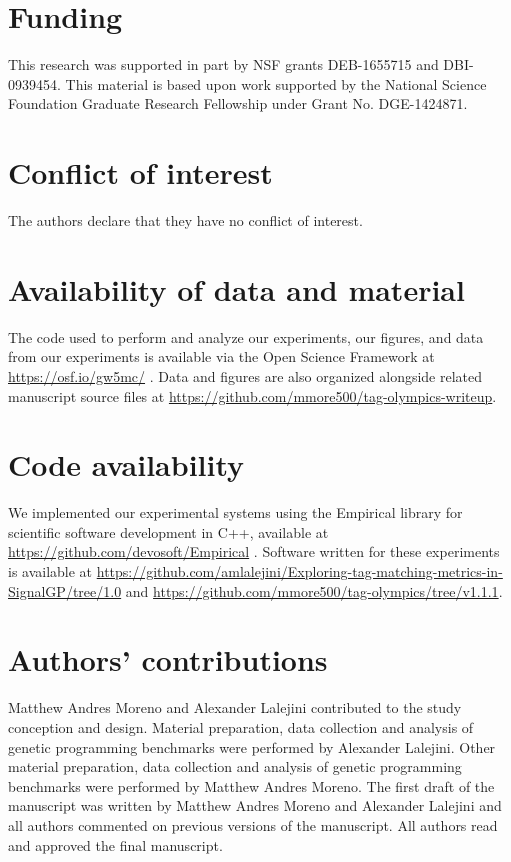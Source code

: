 \section*{Funding}

This research was supported in part by NSF grants DEB-1655715 and DBI-0939454.
This material is based upon work supported by the National Science Foundation Graduate Research Fellowship under Grant No. DGE-1424871.


\section*{Conflict of interest}

The authors declare that they have no conflict of interest.

\section*{Availability of data and material}

The code used to perform and analyze our experiments, our figures, and data from our experiments is available via the Open Science Framework at \url{https://osf.io/gw5mc/} \citep{foster2017open}.
Data and figures are also organized alongside related manuscript source files at \url{https://github.com/mmore500/tag-olympics-writeup}.

\section*{Code availability}

We implemented our experimental systems using the Empirical library for scientific software development in C++, available at \url{https://github.com/devosoft/Empirical} \citep{charles_ofria_2019_2575607}.
Software written for these experiments is available at \url{https://github.com/amlalejini/Exploring-tag-matching-metrics-in-SignalGP/tree/1.0} and \url{https://github.com/mmore500/tag-olympics/tree/v1.1.1}.

\section*{Authors' contributions} Matthew Andres Moreno and Alexander Lalejini contributed to the study conception and design.
Material preparation, data collection and analysis of genetic programming benchmarks were performed by Alexander Lalejini.
Other material preparation, data collection and analysis of genetic programming benchmarks were performed by Matthew Andres Moreno.
The first draft of the manuscript was written by Matthew Andres Moreno and Alexander Lalejini and all authors commented on previous versions of the manuscript.
All authors read and approved the final manuscript.
